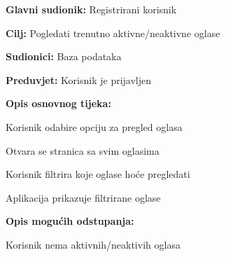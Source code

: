 				\noindent {}
					\begin{packed_item}
	
						\item \textbf{Glavni sudionik: }Registrirani korisnik
						\item  \textbf{Cilj:} Pogledati trenutno aktivne/neaktivne oglase
						\item  \textbf{Sudionici:} Baza podataka
						\item  \textbf{Preduvjet:} Korisnik je prijavljen
						\item  \textbf{Opis osnovnog tijeka:}
						
						\item[] \begin{packed_enum}
	
							\item Korisnik odabire opciju za pregled oglasa
							\item Otvara se stranica sa svim oglasima
							\item Korisnik filtrira koje oglase hoće pregledati
							\item Aplikacija prikazuje filtrirane oglase

						\end{packed_enum}
						
						\item  \textbf{Opis mogućih odstupanja:}
						
						\item[] \begin{packed_item}
	
							\item[2.a] Korisnik nema aktivnih/neaktivih oglasa
							
						\end{packed_item}					
					\end{packed_item}
					
